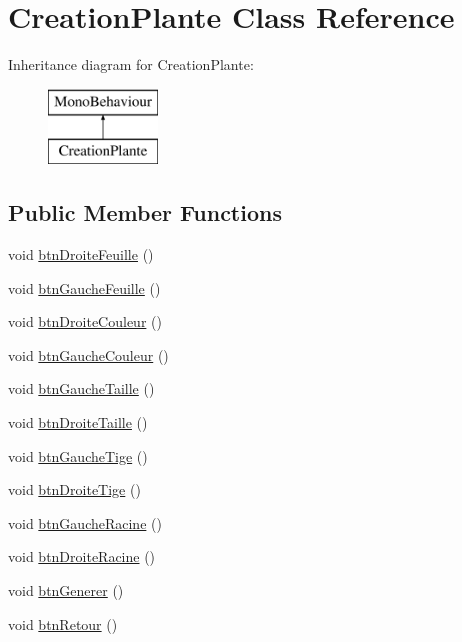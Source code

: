 \hypertarget{class_creation_plante}{}\section{Creation\+Plante Class Reference}
\label{class_creation_plante}
Inheritance diagram for Creation\+Plante\+:\begin{figure}[H]
\begin{center}
\leavevmode
\includegraphics[height=2.000000cm]{class_creation_plante}
\end{center}
\end{figure}
\subsection*{Public Member Functions}
\begin{DoxyCompactItemize}
\item 
void \mbox{\hyperlink{class_creation_plante_a68b1f45a2c83168f78df6b56540e5ac8}{btn\+Droite\+Feuille}} ()
\item 
void \mbox{\hyperlink{class_creation_plante_a9d3916ef1e86a0bd00649f10e1f9ccaa}{btn\+Gauche\+Feuille}} ()
\item 
void \mbox{\hyperlink{class_creation_plante_ab027a3f0d94171786ef9c3f23ac6dd0d}{btn\+Droite\+Couleur}} ()
\item 
void \mbox{\hyperlink{class_creation_plante_a94fa1743f06bd1d7476fe65f3132874d}{btn\+Gauche\+Couleur}} ()
\item 
void \mbox{\hyperlink{class_creation_plante_a1f46479d03a573077b9126190c0dcf66}{btn\+Gauche\+Taille}} ()
\item 
void \mbox{\hyperlink{class_creation_plante_a13a9f44bd18d81db109f73471b01e465}{btn\+Droite\+Taille}} ()
\item 
void \mbox{\hyperlink{class_creation_plante_a82964db45d17f2c2af4ef609b8c96f3b}{btn\+Gauche\+Tige}} ()
\item 
void \mbox{\hyperlink{class_creation_plante_a395f2d532ddef2f3ce4615793931376d}{btn\+Droite\+Tige}} ()
\item 
void \mbox{\hyperlink{class_creation_plante_a8040abc57585cfdc860023bf0e87ba90}{btn\+Gauche\+Racine}} ()
\item 
void \mbox{\hyperlink{class_creation_plante_a1c4657333f2f06b28b2b0fa8252d34d7}{btn\+Droite\+Racine}} ()
\item 
void \mbox{\hyperlink{class_creation_plante_a221cfab4a34d6f5f31f71c440c57a646}{btn\+Generer}} ()
\item 
void \mbox{\hyperlink{class_creation_plante_a382dc77d8f13e4da0b2b36eae58f3324}{btn\+Retour}} ()
\end{DoxyCompactItemize}
